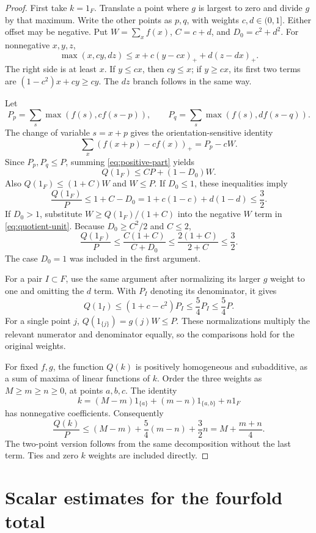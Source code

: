 \documentclass[11pt,a4paper]{article}
\theoremstyle{remark}
\newcommand{\pos}[1]{\left(#1\right)_+}
\begin{document}
\begin{proof}
First take $k=1_F$. Translate a point where $g$ is largest to zero and
divide $g$ by that maximum. Write the other points as $p,q$, with weights
$c,d\in(0,1]$. Either offset may be negative. Put
$W=\sum_x f(x)$, $C=c+d$, and $D_0=c^2+d^2$.
For nonnegative $x,y,z$,
\begin{equation}\label{eq:positive-part}
 \max(x,cy,dz)\le x+c\pos{y-cx}+d\pos{z-dx}.
\end{equation}
The right side is at least $x$. If $y\le cx$, then $cy\le x$;
if $y\ge cx$, its first two terms are $(1-c^2)x+cy\ge cy$.
The $dz$ branch follows in the same way.

Let
\[
 P_p=\sum_s\max(f(s),cf(s-p)),\qquad
 P_q=\sum_s\max(f(s),df(s-q)).
\]
The change of variable $s=x+p$ gives the orientation-sensitive identity
\[
 \sum_x\pos{f(x+p)-cf(x)}=P_p-cW.
\]
Since $P_p,P_q\le P$, summing \eqref{eq:positive-part} yields
\begin{equation}\label{eq:quotient-unit}
 Q(1_F)\le CP+(1-D_0)W.
\end{equation}
Also $Q(1_F)\le(1+C)W$ and $W\le P$.
If $D_0\le1$, these inequalities imply
\[
 \frac{Q(1_F)}P\le1+C-D_0
 =1+c(1-c)+d(1-d)\le\frac32.
\]
If $D_0>1$, substitute $W\ge Q(1_F)/(1+C)$ into the negative $W$ term
in \eqref{eq:quotient-unit}. Because $D_0\ge C^2/2$ and $C\le2$,
\[
 \frac{Q(1_F)}P\le\frac{C(1+C)}{C+D_0}
 \le\frac{2(1+C)}{2+C}\le\frac32.
\]
The case $D_0=1$ was included in the first argument.

For a pair $I\subset F$, use the same argument after normalizing its
larger $g$ weight to one and omitting the $d$ term. With $P_I$ denoting
its denominator, it gives
\[
 Q(1_I)\le(1+c-c^2)P_I\le\frac54P_I\le\frac54P.
\]
For a single point $j$, $Q(1_{\{j\}})=g(j)W\le P$.
These normalizations multiply the relevant numerator and denominator
equally, so the comparisons hold for the original weights.

For fixed $f,g$, the function $Q(k)$ is positively homogeneous and
subadditive, as a sum of maxima of linear functions of $k$.
Order the three weights as $M\ge m\ge n\ge0$, at points $a,b,c$.
The identity
\[
 k=(M-m)1_{\{a\}}+(m-n)1_{\{a,b\}}+n1_F
\]
has nonnegative coefficients. Consequently
\[
 \frac{Q(k)}P\le(M-m)+\frac54(m-n)+\frac32n
 =M+\frac{m+n}{4}.
\]
The two-point version follows from the same decomposition without the
last term. Ties and zero $k$ weights are included directly.
\end{proof}

\section{Scalar estimates for the fourfold total}\label{sec:scalar}
\end{document}
